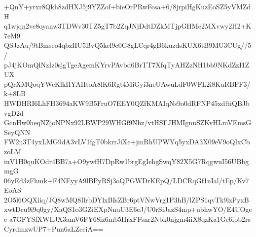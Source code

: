 +QnY+yrxr8Qkh8zdHXJ5j9YZZof+bieOrPRwFcsa+6/8jrpiHgKuzEoSZ5yVMZdH
q1wjqn2ve8oyanw3TDWv30TZ5gT7b2ZqJNjDdtDZkMTjpGHMe2MXvwy2H2+K7eM9
QSJzAu/9tBmseo4qbzHU5BvQ5kel9c0G8gLCqr4gB6kuzdsKUX6tB9MU3CUg//5/
pJ4jKOmQlNzIz0sjgTgeAgemKYrvPAvbd6BrTT7XfqTyAHZzNH1bb9NKdZzI1ZUX
pQrXMQoqYWcKlkHYAHtoA8lK6Rgt4MiGyi3neUAwuLdF0WFL2i8KuRBFF3/k+8LB
HWDHRI6LhFH3694aKW9B5FruO7EEY0QZfKMAIqNs9o0dRFNP45xdftiQBJbvgD2d
GcnHw0heqNZjoNPNx92LBWP29WHGf9Nhz/vtHSFJHMIgnnSZKvHLmVEmsGSeyQNN
FW2n3T4yxLMG9dA3vLV1fgT0bkrrJiXe+jmRhUPWYq5yxDA3X09eV9oQIxCbzoLM
iuV1H0quKOdr4BB7a+O9ywfH7DpRw1brgEgIehgSwqY82X5G7RqgwuI56UBbgmgG
06yEd3zFhmk+F4NEyyA9lBPyRSj3oQPGWDrKEpQ/LDCRqGf1nIal/tEp/Kv7EoAS
2O5l6OQXiiq/JQ8wMQ8IlrbDYlxBIsZBr6ptVNwVrg1P3hB/lZPS1qvTk9lzPyxB
xwtDcu9i9q0gy/XaQS1o3GZiEXpNnuU3E6eJ/U0rSiJazS4mp+ubhwYO/E4UOgee
a7GFYSfXWIlJX3amV6FY68iz6mb5HrxFFsnr2Nbk0njgm4iiX8qzKa1Gc6ipb2rs
CyrdmzwUP7+Pun6aLZceiA==
